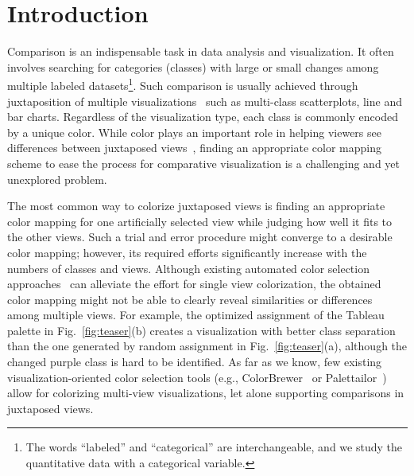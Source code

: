 \section{Introduction}
Comparison is an indispensable task in data analysis and visualization. It often involves searching for categories (classes) with large or small changes among multiple labeled datasets\footnote{The words ``labeled'' and ``categorical'' are interchangeable, and we study the quantitative data with a categorical variable.}.
Such comparison is usually achieved through juxtaposition of multiple visualizations~\cite{Gleicher18,LYi21} such as multi-class scatterplots, line and bar charts.
Regardless of the visualization type, each class is commonly encoded by a unique color. While color plays an important role in helping viewers see differences between juxtaposed views~\cite{Tominski08,Albers11,Gleicher18}, finding an appropriate color mapping scheme to ease the process for comparative visualization is a challenging and yet unexplored problem.

The most common way to colorize juxtaposed views is finding an appropriate color mapping for one  artificially selected view while judging how well it fits to the other views. Such a trial and error procedure might converge to a desirable color mapping; however, its required efforts significantly increase with the numbers of classes and views. Although existing automated color selection approaches~\cite{Chen14,Wang2018,Lu21} can alleviate the effort for single view colorization, the obtained color mapping might not be able to clearly reveal similarities or differences among multiple views. For example, the optimized assignment\cite{Wang2018} of the Tableau palette in Fig.~\ref{fig:teaser}(b) creates a visualization with better class separation than the one generated by random assignment in Fig.~\ref{fig:teaser}(a), although the changed purple class is hard to be identified.
As far as we know, few existing visualization-oriented color selection tools (e.g., ColorBrewer~\cite{harrower2003colorbrewer} or Palettailor~\cite{Lu21}) allow for colorizing multi-view visualizations, let alone supporting comparisons in juxtaposed views. %

